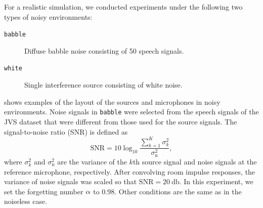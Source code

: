 \documentclass[sip,biber]{now-journal}
\begin{document}
For a realistic simulation, we conducted experiments under the following two types of noisy environments:
\begin{description}
  \item[\texttt{babble}] Diffuse babble noise consisting of 50 speech signals.
  \item[\texttt{white}] Single interference source consisting of white noise.
\end{description}
 shows examples of the layout of the sources and microphones in noisy environments.
Noise signals in \texttt{babble} were selected from the speech signals of the JVS dataset that were different from those used for the source signals.
The signal-to-noise ratio (SNR) is defined as
\begin{equation}
  \text{SNR} = 10 \log _{10} \frac{\sum _{k=1} ^{K} \sigma _{k} ^{2}}{\sigma _{\mathrm{n}} ^{2}},
\end{equation}
where $\sigma _{k} ^{2}$ and $\sigma _\mathrm{n} ^{2}$ are the variance of the $k$th source signal and noise signals at the reference microphone, respectively.
After convolving room impulse responses, the variance of noise signals was scaled so that $\text{SNR} = \SI{20}{\decibel}$.
In this experiment, we set the forgetting number $\alpha$ to 0.98.
Other conditions are the same as in the noiseless case.
\end{document}

